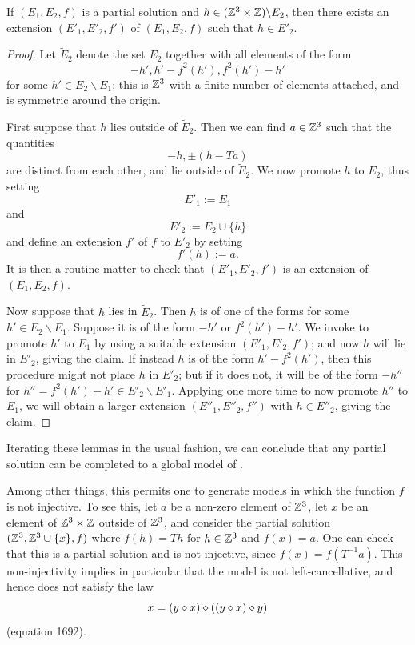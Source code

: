 \begin{lemma}[Promoting to $E_2$]\label{add-E2}  If $(E_1,E_2,f)$ is a partial solution and $h \in (\mathbb{Z}^3 \times \mathbb{Z}) \backslash E_2$, then there exists an extension $(E'_1,E'_2,f')$ of $(E_1,E_2,f)$ such that $h \in E'_2$.
\end{lemma}

\begin{proof}  Let $\tilde E_2$ denote the set $E_2$ together with all elements of the form
\begin{equation}\label{hp-form}
 -h', h' - f^2(h'), f^2(h') - h'
\end{equation}
for some $h' \in E_2 \backslash E_1$; this is $\mathbb{Z}^3$ with a finite number of elements attached, and is symmetric around the origin.

First suppose that $h$ lies outside of $\tilde E_2$.  Then we can find $a \in \mathbb{Z}^3$ such that the quantities
$$ -h, \pm (h - Ta)$$
are distinct from each other, and lie outside of $\tilde E_2$.  We now promote $h$ to $E_2$, thus setting
$$ E'_1 := E_1$$
and
$$ E'_2 := E_2 \cup \{h\}$$
and define an extension $f'$ of $f$ to $E'_2$ by setting
$$ f'(h) := a.$$
It is then a routine matter to check that $(E'_1,E'_2,f')$ is an extension of $(E_1,E_2,f)$.

Now suppose that $h$ lies in $\tilde E_2$.  Then $h$ is of one of the forms  for some $h' \in E_2 \backslash E_1$.  Suppose it is of the form $-h'$ or $f^2(h') - h'$.  We invoke  to promote $h'$ to $E_1$ by using a suitable extension $(E'_1,E'_2,f')$; and now $h$ will lie in $E'_2$, giving the claim.  If instead $h$ is of the form $h'-f^2(h')$, then this procedure might not place $h$ in $E'_2$; but if it does not, it will be of the form $-h''$ for $h'' = f^2(h')-h' \in E'_2 \backslash E'_1$.  Applying  one more time to now promote $h''$ to $E_1$, we will obtain a larger extension $(E''_1,E''_2,f'')$ with $h \in E''_2$, giving the claim.
\end{proof}

Iterating these lemmas in the usual fashion, we can conclude that any partial solution can be completed to a global model of .

Among other things, this permits one to generate models in which the function $f$ is not injective.  To see this, let $a$ be a non-zero element of $\mathbb{Z}^3$, let $x$ be an element of $\mathbb{Z}^3 \times \mathbb{Z}$ outside of $\mathbb{Z}^3$, and consider the partial solution $(\mathbb{Z}^3, \mathbb{Z}^3 \cup \{x\}, f)$ where $f(h) = Th$ for $h \in \mathbb{Z}^3$ and $f(x) = a$.  One can check that this is a partial solution and is not injective, since $f(x) = f(T^{-1} a)$.  This non-injectivity implies in particular that the model is not left-cancellative, and hence does not satisfy the law
$$ x = (y \diamond x) \diamond ((y \diamond x) \diamond y)$$
(equation 1692).

